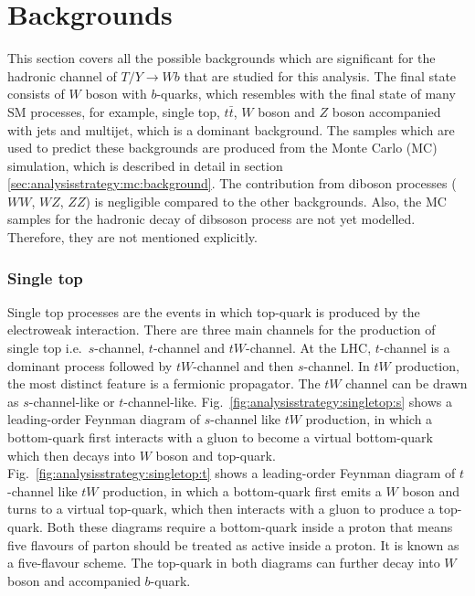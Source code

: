 \section{Backgrounds}%
\label{sec:analysisstrategy:backgrounds}
This section covers all the possible backgrounds which are significant for the hadronic channel of $T/Y\rightarrow Wb$ that are studied for this analysis. The final state consists of $W$ boson with $b$-quarks, which resembles with the final state of many SM processes, for example, single top, $t\bar{t}$, $W$ boson and $Z$ boson accompanied with jets and multijet, which is a dominant background. The samples which are used to predict these backgrounds are produced from the Monte Carlo (MC) simulation, which is described in detail in section \ref{sec:analysisstrategy:mc:background}. The contribution from diboson processes ($WW$, $WZ$, $ZZ$) is negligible compared to the other backgrounds. Also, the MC samples for the hadronic decay of dibsoson process are not yet modelled. Therefore, they are not mentioned explicitly. 
\subsubsection{Single top}%
\label{sec:analysisstrategy:singletop}
Single top processes are the events in which top-quark is produced by the electroweak interaction. There are three main channels for the production of single top i.e.\ $s$-channel, $t$-channel and $tW$-channel. At the LHC, $t$-channel is a dominant process followed by $tW$-channel and then $s$-channel. In $tW$ production, the most distinct feature is a fermionic propagator. The $tW$ channel can be drawn as $s$-channel-like or $t$-channel-like. Fig.\ \ref{fig:analysisstrategy:singletop:s} shows a leading-order Feynman diagram of $s$-channel like $tW$ production, in which a bottom-quark first interacts with a gluon to become a virtual bottom-quark which then decays into $W$ boson and top-quark. Fig.\ \ref{fig:analysisstrategy:singletop:t} shows a leading-order Feynman diagram of $t$-channel like $tW$ production, in which a bottom-quark first emits a $W$ boson and turns to a virtual top-quark, which then interacts with a gluon to produce a top-quark. Both these diagrams require a bottom-quark inside a proton that means five flavours of parton should be treated as active inside a proton. It is known as a five-flavour scheme. The top-quark in both diagrams can further decay into $W$ boson and accompanied $b$-quark.~\cite{thesis:rui}  

